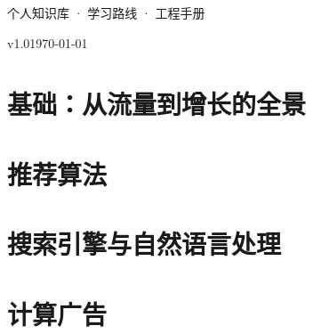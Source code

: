 \documentclass[UTF8, fontset=\NotesFontSet, 11pt, oneside, openany]{ctexbook}
\newcommand{\BookVersion}{v1.0}
\newcommand{\BookDate}{\today}
\begin{document}
\begin{titlepage}
\vfill

{\sffamily\large\color{SlateGray} 个人知识库 · 学习路线 · 工程手册 \par}
\vspace{0.5cm}
{\sffamily\small\color{SlateGray} \BookVersion \quad \BookDate \par}
\vspace{1.2cm}
\end{titlepage}

\frontmatter
\pagestyle{plain}




\cleardoublepage
{}
\tableofcontents

\cleardoublepage
{}
\listoffigures
\listoftables

\mainmatter
\pagestyle{fancy}

\part{基础：从流量到增长的全景}



\part{推荐算法}





\part{搜索引擎与自然语言处理}





\part{计算广告}


\end{document}
